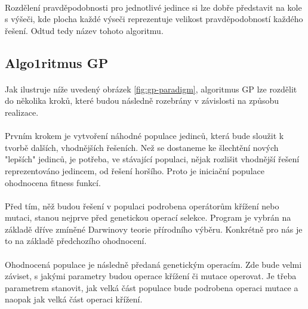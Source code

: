 \documentclass[bc,male,java,dept460]{diploma}		%
\begin{document}
\paragraph*{}
Rozdělení pravděpodobnosti pro jednotlivé jedince si lze dobře představit na kole s výšeči, kde plocha každé výseči reprezentuje velikost pravděpodobností každého řešení. Odtud tedy název tohoto algoritmu.


\subsection{Algo1ritmus GP}
\paragraph*{}
Jak ilustruje níže uvedený obrázek \ref{fig:gp-paradigm}, algoritmus GP lze rozdělit do několika kroků, které budou následně rozebrány v závislosti na způsobu realizace.

\paragraph*{}
Prvním krokem je vytvoření náhodné populace jedinců, která bude sloužit k tvorbě dalších, vhodnějších řešeních.
Než se dostaneme ke šlechtění nových "lepších" jedinců, je potřeba, ve stávající populaci, nějak rozlišit vhodnější řešení reprezentováno jedincem, od řešení horšího. Proto je iniciační populace ohodnocena fitness funkcí.

\paragraph*{}
Před tím, něž budou řešení v populaci podrobena operátorům křížení nebo mutaci, stanou nejprve před genetickou operací selekce. Program je vybrán na základě dříve zmíněné Darwinovy teorie přírodního výběru. Konkrétně pro nás je to na základě předchozího ohodnocení.

\paragraph*{}
Ohodnocená populace je následně předaná genetickým operacím. Zde bude velmi záviset, s jakými parametry budou operace křížení či mutace operovat. Je třeba parametrem stanovit, jak velká část populace bude podrobena operaci mutace a naopak jak velká část operaci křížení. 
\end{document}
